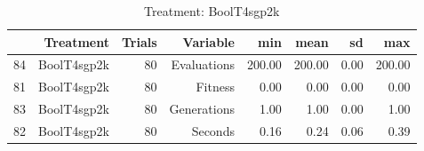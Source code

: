 \begin{table}[ht]
\centering
\begin{tabular}{rrrrrrrr}
  \hline
 & Treatment & Trials & Variable & min & mean & sd & max \\ 
  \hline
84 & BoolT4sgp2k &  80 & Evaluations & 200.00 & 200.00 & 0.00 & 200.00 \\ 
  81 & BoolT4sgp2k &  80 & Fitness & 0.00 & 0.00 & 0.00 & 0.00 \\ 
  83 & BoolT4sgp2k &  80 & Generations & 1.00 & 1.00 & 0.00 & 1.00 \\ 
  82 & BoolT4sgp2k &  80 & Seconds & 0.16 & 0.24 & 0.06 & 0.39 \\ 
   \hline
\end{tabular}
\caption{Treatment: BoolT4sgp2k} 
\end{table}
